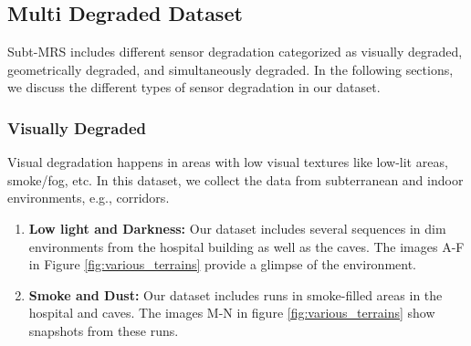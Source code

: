 \documentclass[10pt,twocolumn,letterpaper]{article}
\begin{document}



\subsection{Multi Degraded Dataset}

Subt-MRS includes different sensor degradation categorized as visually degraded, geometrically degraded, and simultaneously degraded.
In the following sections, we discuss the different types of sensor degradation in our dataset.

\subsubsection{ Visually Degraded}
Visual degradation happens in areas with low visual textures like low-lit areas, smoke/fog, etc.
In this dataset, we collect the data from subterranean and indoor environments, e.g., corridors.

\begin{enumerate}[label=(\alph*)]
    \item \textbf{Low light and Darkness:} Our dataset includes several sequences in dim environments from the hospital building as well as the caves. 
    The images A-F in Figure \ref{fig:various_terrains} provide a glimpse of the environment.
    \item \textbf{Smoke and Dust:} Our dataset includes runs in smoke-filled areas in the hospital and caves. The images M-N in figure \ref{fig:various_terrains} show snapshots from these runs.
    
    
\end{enumerate}
\end{document}
